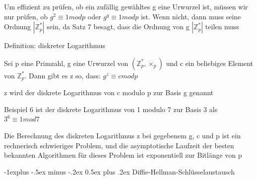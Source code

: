 \documentclass[a4paper]{article}
\makeatletter
\renewcommand{\subsection}{\@startsection{subsection}{2}{0mm}%
 {-1explus -.5ex minus -.2ex}%
 {0.5ex plus .2ex}%
 {\normalfont\normalsize\bfseries}}
\makeatother
\begin{document}
\begin{multicols}{3}
\begin{itemize*}
\begin{itemize*}
\begin{itemize*}
                        \item Um effizient zu prüfen, ob ein zufällig gewähltes g eine Urwurzel ist, müssen wir nur prüfen, ob $g^2\equiv 1 mod p$ oder $g^q\equiv 1 mod p$ ist. Wenn nicht, dann muss seine Ordnung $|\mathbb{Z}^*_p|$ sein, da Satz 7 besagt, dass die Ordnung von g $|\mathbb{Z}^*_p|$ teilen muss
                  \end{itemize*}
            \end{itemize*}
            \item Definition: diskreter Logarithmus
            \begin{itemize*}
                  \item Sei p eine Primzahl, g eine Urwurzel von $(\mathbb{Z}^*_p,\times_p)$ und c ein beliebiges Element von $\mathbb{Z}^*_p$. Dann gibt es z so, dass: $g^z\equiv c mod p$
                  \item z wird der diskrete Logarithmus von c modulo p zur Basis g genannt
                  \item Beispiel 6 ist der diskrete Logarithmus von 1 modulo 7 zur Basis 3 als $3^6\equiv 1 mod 7$
                  \item Die Berechnung des diskreten Logarithmus z bei gegebenem g, c und p ist ein rechnerisch schwieriges Problem, und die asymptotische Laufzeit der besten bekannten Algorithmen für dieses Problem ist exponentiell zur Bitlänge von p
            \end{itemize*}
      \end{itemize*}


      \subsection{Diffie-Hellman-Schlüsselaustausch}


\end{multicols}
\end{document}
